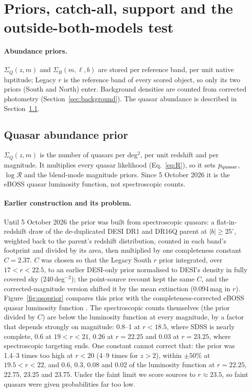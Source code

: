 \documentclass[11pt,a4paper]{article}
\newcommand{\R}{\mathcal{R}}
\begin{document}
\section{Priors, catch-all, support and the outside-both-models test}\label{sec:priors}
\paragraph{Abundance priors.} $\Sigma_Q(z,m)$ and $\Sigma_B(m,\ell,b)$ are stored per reference band, per unit
native luptitude; Legacy $r$ is the reference band of every scored object, so only its two priors (South and
North) enter. Background densities are counted from corrected photometry (Section~\ref{sec:background}). The
quasar abundance is described in Section~\ref{sec:qsoprior}.

\subsection{Quasar abundance prior}\label{sec:qsoprior}
$\Sigma_Q(z,m)$ is the number of quasars per deg$^2$, per unit redshift and per magnitude. It multiplies every
quasar likelihood (Eq.~\ref{eq:R}), so it sets $p_{\rm quasar}$, $\log\R$ and the blend-mode magnitude priors.
Since 5 October 2026 it is the eBOSS quasar luminosity function, not spectroscopic counts.

\paragraph{Earlier construction and its problem.} Until 5 October 2026 the prior was built from spectroscopic
quasars: a flat-in-redshift draw of the de-duplicated DESI DR1 and DR16Q parent at $|b|\ge25^\circ$, weighted
back to the parent's redshift distribution, counted in each band's footprint and divided by its area, then
multiplied by one completeness constant $C=2.37$. $C$ was chosen so that the Legacy South $r$ prior integrated,
over $17<r<22.5$, to an earlier DESI-only prior normalised to DESI's density in fully covered sky
(240\,deg$^{-2}$); the point-source recount kept the same $C$, and the corrected-magnitude version shifted it by
the mean extinction (0.094\,mag in $r$). Figure~\ref{fig:qsoprior} compares this prior with the
completeness-corrected eBOSS quasar luminosity function \citep{PalanqueDelabrouille2016}. The spectroscopic
counts themselves (the prior divided by $C$) are below the luminosity function at every magnitude, by a factor
that depends strongly on magnitude: 0.8--1 at $r<18.5$, where SDSS is nearly complete, 0.6 at $19<r<21$, 0.26 at
$r=22.25$ and 0.03 at $r=23.25$, where spectroscopic targeting ends. One constant cannot correct that: the prior
was 1.4--3 times too high at $r<20$ (4--9 times for $z>2$), within $\pm50\%$ at $19.5<r<22$, and 0.6, 0.3, 0.08 and
0.02 of the luminosity function at $r=22.25$, 22.75, 23.25 and 23.75. Under the faint limit we score sources to
$r\approx23.5$, so faint quasars were given probabilities far too low.
\end{document}
